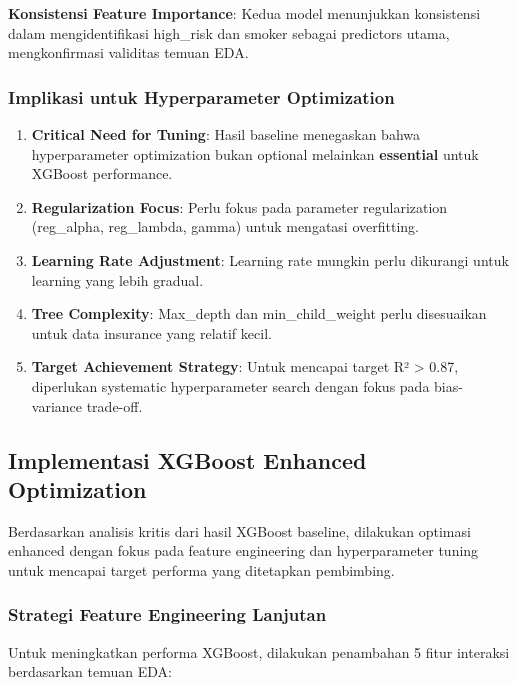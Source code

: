 \textbf{Konsistensi Feature Importance}: Kedua model menunjukkan konsistensi dalam mengidentifikasi high\_risk dan smoker sebagai predictors utama, mengkonfirmasi validitas temuan EDA.

\subsubsection{Implikasi untuk Hyperparameter Optimization}
\begin{enumerate}
    \item \textbf{Critical Need for Tuning}: Hasil baseline menegaskan bahwa hyperparameter optimization bukan optional melainkan \textbf{essential} untuk XGBoost performance.

    \item \textbf{Regularization Focus}: Perlu fokus pada parameter regularization (reg\_alpha, reg\_lambda, gamma) untuk mengatasi overfitting.

    \item \textbf{Learning Rate Adjustment}: Learning rate mungkin perlu dikurangi untuk learning yang lebih gradual.

    \item \textbf{Tree Complexity}: Max\_depth dan min\_child\_weight perlu disesuaikan untuk data insurance yang relatif kecil.

    \item \textbf{Target Achievement Strategy}: Untuk mencapai target R² > 0.87, diperlukan systematic hyperparameter search dengan fokus pada bias-variance trade-off.
\end{enumerate}

\subsection{Implementasi XGBoost Enhanced Optimization}
\label{subsec:xgboost-enhanced}

Berdasarkan analisis kritis dari hasil XGBoost baseline, dilakukan optimasi enhanced dengan fokus pada feature engineering dan hyperparameter tuning untuk mencapai target performa yang ditetapkan pembimbing.

\subsubsection{Strategi Feature Engineering Lanjutan}
Untuk meningkatkan performa XGBoost, dilakukan penambahan 5 fitur interaksi berdasarkan temuan EDA:


